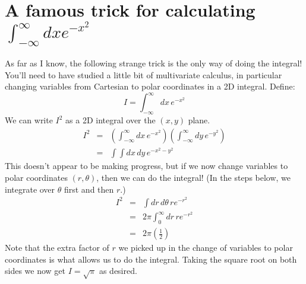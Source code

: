 \documentclass[aps,prd,superscriptaddress,groupedaddress,nofootinbib,nobibnotes]{revtex4}
\newcommand{\be}{\begin{equation}}
\newcommand{\ee}{\end{equation}}
\newcommand{\ba}{\begin{eqnarray}}
\newcommand{\ea}{\end{eqnarray}}
\newcommand{\nn}{\nonumber}
\begin{document}
\appendix
\section{A famous trick for calculating $\int_{-\infty}^\infty dx e^{-x^2}$}

\par\noindent
As far as I know, the following strange trick is the only way of doing the integral!
You'll need to have studied a little bit of multivariate calculus, in particular changing variables from
Cartesian to polar coordinates in a 2D integral.
Define:
\be
I = \int_{-\infty}^\infty dx \, e^{-x^2}
\ee
We can write $I^2$ as a 2D integral over the $(x,y)$ plane.
\ba
I^2 &=& \left( \int_{-\infty}^\infty dx \, e^{-x^2} \right) \left( \int_{-\infty}^\infty dy \, e^{-y^2} \right)  \nn \\
  &=& \int \int dx\, dy \, e^{-x^2-y^2}
\ea
This doesn't appear to be making progress, but if we now change variables to polar coordinates $(r,\theta)$,
then we can do the integral!  (In the steps below, we integrate over $\theta$ first and then $r$.)
\ba
I^2 &=& \int dr \, d\theta \, r e^{-r^2}  \nn \\
    &=& 2 \pi \int_0^\infty dr \, r e^{-r^2} \nn \\
    &=& 2 \pi \left( \frac{1}{2} \right)
\ea
Note that the extra factor of $r$ we picked up in the change of variables to polar coordinates is what
allows us to do the integral.  Taking the square root on both sides we now get $I = \sqrt{\pi}$ as desired.
\end{document}
